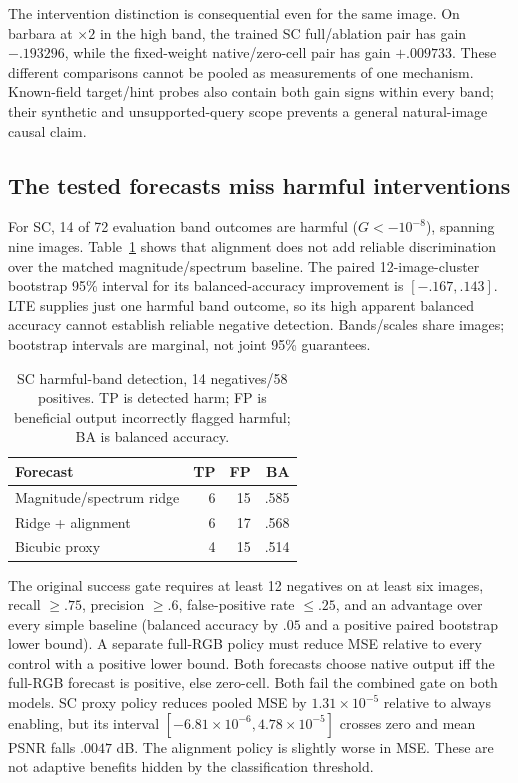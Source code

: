 The intervention distinction is consequential even for the same image.
On barbara at $\times2$ in the high band, the trained SC full/ablation
pair has gain $-.193296$, while the fixed-weight native/zero-cell pair
has gain $+.009733$. These different comparisons cannot be pooled
as measurements of one mechanism. Known-field target/hint probes also
contain both gain signs within every band; their synthetic and
unsupported-query scope prevents a general natural-image causal claim.

\subsection{The tested forecasts miss harmful interventions}
For SC, 14 of 72 evaluation band outcomes are harmful
($G<-10^{-8}$), spanning nine images. Table~\ref{tab:negative} shows
that alignment does not add reliable discrimination over the matched
magnitude/spectrum baseline. The paired 12-image-cluster bootstrap
95\% interval for its balanced-accuracy improvement is
$[-.167,.143]$. LTE supplies just one harmful band outcome, so its high
apparent balanced accuracy cannot establish reliable negative detection.
Bands/scales share images; bootstrap intervals are marginal, not joint
95\% guarantees.

\begin{table}[t]\centering
\caption{SC harmful-band detection, 14 negatives/58 positives.
TP is detected harm; FP is beneficial output incorrectly flagged harmful;
BA is balanced accuracy.}
\label{tab:negative}
\begin{tabular}{lrrr}\toprule
Forecast & TP & FP & BA\\\midrule
Magnitude/spectrum ridge & 6 & 15 & .585\\
Ridge + alignment & 6 & 17 & .568\\
Bicubic proxy & 4 & 15 & .514\\\bottomrule
\end{tabular}
\end{table}

The original success gate requires at least 12 negatives on at least six
images, recall $\ge.75$,
precision $\ge.6$, false-positive rate $\le.25$, and an advantage over
every simple baseline (balanced accuracy by $.05$ and a positive paired
bootstrap lower bound). A separate full-RGB policy must reduce MSE
relative to every control with a positive lower bound. Both forecasts
choose native output iff the full-RGB forecast is positive, else zero-cell.
Both
fail the combined gate on both models. SC proxy policy reduces pooled
MSE by $1.31\times10^{-5}$ relative to always enabling, but its interval
$[-6.81\times10^{-6},4.78\times10^{-5}]$ crosses zero and mean PSNR falls
$.0047$ dB. The alignment policy is slightly worse in MSE. These are
not adaptive benefits hidden by the classification threshold.

